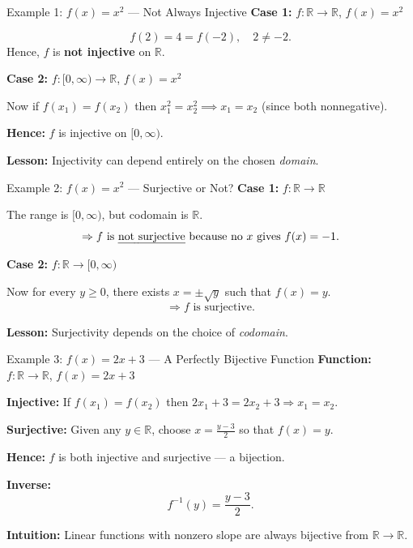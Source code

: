 \documentclass[11pt]{beamer}
\theoremstyle{plain}
\begin{document}
\begin{frame}{Example 1: $f(x) = x^2$ — Not Always Injective}
\textbf{Case 1:} $f: \mathbb{R} \to \mathbb{R}$, $f(x) = x^2$

\[
f(2) = 4 = f(-2), \quad 2 \neq -2.
\]
Hence, $f$ is \textbf{not injective} on $\mathbb{R}$.

\medskip
\textbf{Case 2:} $f: [0, \infty) \to \mathbb{R}$, $f(x) = x^2$

Now if $f(x_1) = f(x_2)$ then $x_1^2 = x_2^2\implies x_1 = x_2$ (since both nonnegative).

\textbf{Hence:} $f$ is injective on $[0,\infty)$.

\medskip
\textbf{Lesson:}  
Injectivity can depend entirely on the chosen \emph{domain}.
\end{frame}

\begin{frame}{Example 2: $f(x) = x^2$ — Surjective or Not?}
\textbf{Case 1:} $f: \mathbb{R} \to \mathbb{R}$

The range is $[0,\infty)$, but codomain is $\mathbb{R}$.  
\[
\Rightarrow \text{$f$ is \emph{not surjective}} \text{ because no $x$ gives } f(x) = -1.
\]

\medskip
\textbf{Case 2:} $f: \mathbb{R} \to [0,\infty)$

Now for every $y \ge 0$, there exists $x = \pm \sqrt{y}$ such that $f(x)=y$.  
\[
\Rightarrow \text{$f$ is surjective.}
\]

\medskip
\textbf{Lesson:}  
Surjectivity depends on the choice of \emph{codomain}.
\end{frame}

\begin{frame}{Example 3: $f(x) = 2x + 3$ — A Perfectly Bijective Function}
\textbf{Function:} $f: \mathbb{R} \to \mathbb{R}$, $f(x) = 2x + 3$

\textbf{Injective:}
If $f(x_1) = f(x_2)$ then $2x_1 + 3 = 2x_2 + 3 \Rightarrow x_1 = x_2.$

\textbf{Surjective:}
Given any $y \in \mathbb{R}$, choose $x = \frac{y - 3}{2}$ so that $f(x) = y$.

\textbf{Hence:} $f$ is both injective and surjective — a bijection.

\medskip
\textbf{Inverse:}
\[
f^{-1}(y) = \frac{y - 3}{2}.
\]

\textbf{Intuition:}  
Linear functions with nonzero slope are always bijective from $\mathbb{R} \to \mathbb{R}$.
\end{frame}
\end{document}
